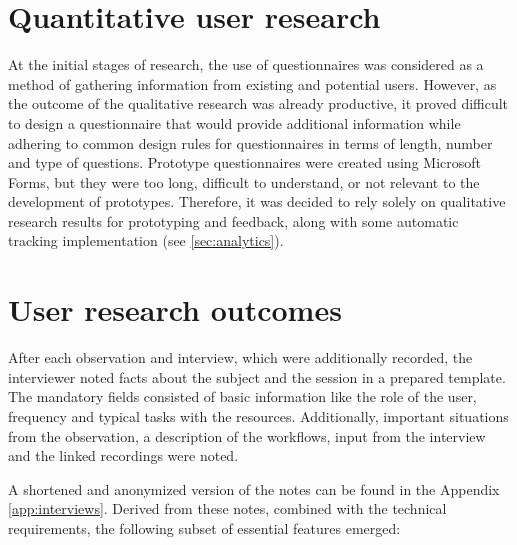 \section{Quantitative user research}

At the initial stages of research, the use of questionnaires was considered as a method of gathering information from existing and potential users.
However, as the outcome of the qualitative research was already productive, it proved difficult to design a questionnaire that would provide additional information while adhering to common design rules for questionnaires in terms of length, number and type of questions.
Prototype questionnaires were created using Microsoft Forms, but they were too long, difficult to understand, or not relevant to the development of prototypes.
Therefore, it was decided to rely solely on qualitative research results for prototyping and feedback, along with some automatic tracking implementation (see \ref{sec:analytics}).
\\
\section{User research outcomes}

After each observation and interview, which were additionally recorded, the interviewer noted facts about the subject and the session in a prepared template.
The mandatory fields consisted of basic information like the role of the user, frequency and typical tasks with the resources.
Additionally, important situations from the observation, a description of the workflows, input from the interview and the linked recordings were noted.

A shortened and anonymized version of the notes can be found in the Appendix \ref{app:interviews}.
Derived from these notes, combined with the technical requirements, the following subset of essential features emerged:

